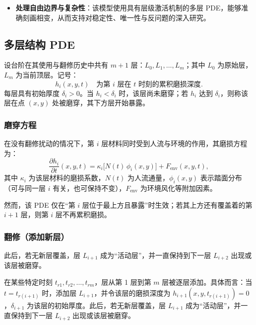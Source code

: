 \documentclass[11pt,a4paper,fontset=windows]{ctexart}
\begin{document}
\begin{itemize}
\item \textbf{处理自由边界与复杂性}：该模型使用具有层级激活机制的多层 PDE，能够准确刻画相变，从而支持对稳定性、唯一性与反问题的深入研究。
\end{itemize}

\subsection{多层结构 PDE}

设台阶在其使用与翻修历史中共有 $m+1$ 层：$L_0,L_1,\dots,L_m$；其中 $L_0$ 为原始层，$L_m$ 为当前顶层。记号：
\begin{equation}
h_i(x,y,t)\quad\text{为第 }i\text{ 层在 }t\text{ 时刻的累积磨损深度}.
\end{equation}
每层具有初始厚度 $\delta_i>0$。当 $h_i<\delta_i$ 时，该层尚未磨穿；若 $h_i$ 达到 $\delta_i$，则称该层在点 $(x,y)$ 处被磨穿，其下方层开始暴露。

\subsubsection{磨穿方程}

在没有翻修扰动的情况下，第 $i$ 层材料同时受到人流与环境的作用，其磨损方程为：
\begin{equation}
\frac{\partial h_i}{\partial t}(x,y,t)=\kappa_i\bigl[N(t)\,\phi_i(x,y)\bigr]+F_{\text{env}}(x,y,t),
\end{equation}
其中 $\kappa_i$ 为该层材料的磨损系数，$N(t)$ 为人流通量，$\phi_i(x,y)$ 表示踏面分布（可与同一层 $i$ 有关，也可保持不变），$F_{\text{env}}$ 为环境风化等附加因素。

然而，该 PDE 仅在“第 $i$ 层位于最上方且暴露”时生效；若其上方还有覆盖着的第 $i+1$ 层，则第 $i$ 层不再累积磨损。

\subsubsection{翻修（添加新层）}

此后，若无新层覆盖，层 $L_{i+1}$ 成为“活动层”，并一直保持到下一层 $L_{i+2}$ 出现或该层被磨穿。

在某些特定时刻 $t_{r1},t_{r2},\dots,t_{rm}$，层从第 1 层到第 $m$ 层被逐层添加。具体而言：当 $t=t_{r(i+1)}$ 时，添加层 $L_{i+1}$，并令该层的磨损深度为 $h_{i+1}(x,y,t_{r(i+1)})=0$，$\delta_{i+1}$ 为该层的初始厚度。此后，若无新层覆盖，层 $L_{i+1}$ 成为“活动层”，并一直保持到下一层 $L_{i+2}$ 出现或该层被磨穿。
\end{document}
